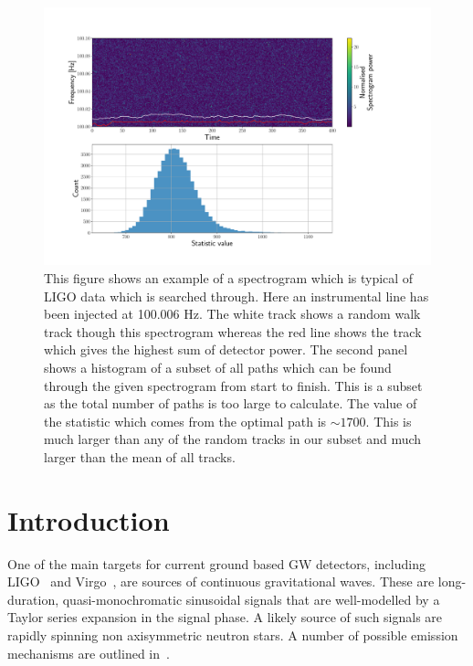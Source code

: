 \begin{figure}

\centering
\includegraphics[width=\linewidth]{C3_soap/soap_spect_motivation.pdf}
\caption{This figure shows an example of a spectrogram which is typical of LIGO data which is searched through. Here an instrumental line has been injected at 100.006 Hz. The white track shows a random walk track though this spectrogram whereas the red line shows the track which gives the highest sum of detector power. The second panel shows a histogram of a subset of all paths which can be found through the given spectrogram from start to finish. This is a subset as the total number of paths is too large to calculate. The value of the statistic which comes from the optimal path is $\sim1700$. This is much larger than any of the random tracks in our subset and much larger than the mean of all tracks. }
\label{soap:motivation:plot}

\end{figure}

\section{Introduction}

%
%
One of the main targets for current ground based \ac{GW} detectors, including \ac{LIGO}~\citep{abbott2009LIGOLaser, aasi2015AdvancedLIGO} and Virgo~\citep{acernese2008StatusVirgo, acernese2015AdvancedVirgo}, are sources of continuous gravitational waves. These are long-duration, quasi-monochromatic  sinusoidal signals that are well-modelled by a Taylor series expansion in the signal phase. A likely source of such signals are rapidly spinning non axisymmetric neutron stars.  A number of possible emission mechanisms are outlined in~\citep{prix2009GravitationalWaves,owen2009ProbingNeutron}.

